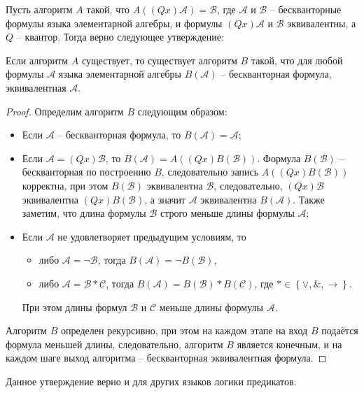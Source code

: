 Пусть алгоритм $A$ такой, что $A\left(\left(Qx\right)\mathcal{A}\right) = \mathcal{B}$, где $\mathcal{A}$ и $\mathcal{B}$ -- бескванторные формулы языка элементарной алгебры, и формулы $(Qx)\mathcal{A}$ и $\mathcal{B}$ эквивалентны, а $Q$ -- квантор. Тогда верно следующее утверждение:
\begin{proposal}\label{algB}
    Если алгоритм $A$ существует, то существует алгоритм $B$ такой, что для любой формулы $\mathcal{A}$ языка элементарной алгебры $B\left(\mathcal{A}\right)$ -- бескванторная формула, эквивалентная $\mathcal{A}$.
\end{proposal}   
\begin{proof}
    Определим алгоритм $B$ следующим образом:
    \begin{itemize}
        \item Если $\mathcal{A}$ -- бескванторная формула, то $B\left(\mathcal{A}\right) = \mathcal{A}$;
        \item Если $\mathcal{A} = \left(Qx\right)\mathcal{B}$, то $B\left(\mathcal{A}\right) = A\left(\left(Qx\right)B\left(\mathcal{B}\right)\right)$. Формула $B\left(\mathcal{B}\right)$ -- бескванторная по построению $B$, следовательно запись $A\left(\left(Qx\right)B\left(\mathcal{B}\right)\right)$ корректна, при этом $B\left(\mathcal{B}\right)$ эквивалентна $\mathcal{B}$, следовательно, $\left(Qx\right)\mathcal{B}$ эквивалентна $\left(Qx\right)B\left(\mathcal{B}\right)$, а значит $\mathcal{A}$ эквивалентна $B\left(\mathcal{A}\right)$. Также заметим, что длина формулы $\mathcal{B}$ строго меньше длины формулы $\mathcal{A}$;
        \item Если $\mathcal{A}$ не удовлетворяет предыдущим условиям, то
        \begin{itemize}
            \item либо $\mathcal{A} = \lnot \mathcal{B}$, тогда $B\left(\mathcal{A}\right) = \lnot B\left(\mathcal{B}\right)$,
            \item либо $\mathcal{A} = \mathcal{B} * \mathcal{C}$, тогда $B\left(\mathcal{A}\right) = B\left(\mathcal{B}\right) * B\left(\mathcal{C}\right)$, где $* \in \left\{\lor, \&, \to\right\}$.
        \end{itemize}
        При этом длины формул $\mathcal{B}$ и $\mathcal{C}$ меньше длины формулы $\mathcal{A}$.
    \end{itemize}
    Алгоритм $B$ определен рекурсивно, при этом на каждом этапе на вход $B$ подаётся формула меньшей длины, следовательно, алгоритм $B$ является конечным, и на каждом шаге выход алгоритма -- бескванторная эквивалентная формула.
\end{proof} 
\begin{remark}
    Данное утверждение верно и для других языков логики предикатов.
\end{remark}

